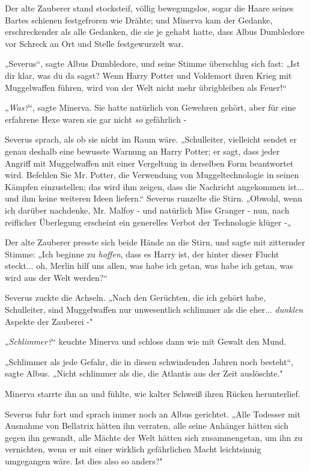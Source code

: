 {Der alte Zauberer stand stocksteif, völlig bewegungslos, sogar die Haare seines Bartes schienen festgefroren wie Drähte; und Minerva kam der Gedanke, erschreckender als alle Gedanken, die sie je gehabt hatte, dass Albus Dumbledore vor Schreck an Ort und Stelle festgewurzelt war.

„Severus“, sagte Albus Dumbledore, und seine Stimme überschlug sich fast: „Ist dir klar, was du da sagst? Wenn Harry Potter und Voldemort ihren Krieg mit Muggelwaffen führen, wird von der Welt nicht mehr übrigbleiben als Feuer!“

„\emph{Was?}“, sagte Minerva. Sie hatte natürlich von Gewehren gehört, aber für eine erfahrene Hexe waren sie gar nicht \emph{so} gefährlich -

Severus sprach, als ob sie nicht im Raum wäre. „Schulleiter, vielleicht sendet er genau deshalb eine bewusste Warnung an Harry Potter; er sagt, dass jeder Angriff mit Muggelwaffen mit einer Vergeltung in derselben Form beantwortet wird. Befehlen Sie Mr. Potter, die Verwendung von Muggeltechnologie in seinen Kämpfen einzustellen; das wird ihm zeigen, dass die Nachricht angekommen ist... und ihm keine weiteren Ideen liefern.“ Severus runzelte die Stirn. „Obwohl, wenn ich darüber nachdenke, Mr. Malfoy - und natürlich Miss Granger - nun, nach reiflicher Überlegung erscheint ein generelles Verbot der Technologie klüger -„

Der alte Zauberer presste sich beide Hände an die Stirn, und sagte mit zitternder Stimme: „Ich beginne zu \emph{hoffen}, dass es Harry ist, der hinter dieser Flucht steckt... oh, Merlin hilf uns allen, was habe ich getan, was habe ich getan, was wird aus der Welt werden?“

Severus zuckte die Achseln. „Nach den Gerüchten, die ich gehört habe, Schulleiter, sind Muggelwaffen nur unwesentlich schlimmer als die eher... \emph{dunklen} Aspekte der Zauberei -"

„\emph{Schlimmer?}“ keuchte Minerva und schloss dann wie mit Gewalt den Mund.

„Schlimmer als jede Gefahr, die in diesen schwindenden Jahren noch besteht“, sagte Albus. „Nicht schlimmer als die, die Atlantis aus der Zeit auslöschte."

Minerva starrte ihn an und fühlte, wie kalter Schweiß ihren Rücken herunterlief.

Severus fuhr fort und sprach immer noch an Albus gerichtet. „Alle Todesser mit Ausnahme von Bellatrix hätten ihn verraten, alle seine Anhänger hätten sich gegen ihn gewandt, alle Mächte der Welt hätten sich zusammengetan, um ihn zu vernichten, wenn er mit einer wirklich gefährlichen Macht leichtsinnig umgegangen wäre. Ist dies also so anders?"

}
